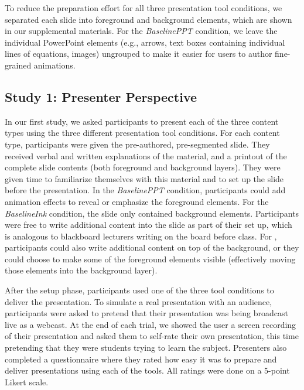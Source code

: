 To reduce the preparation effort for all three presentation tool conditions, we separated each slide into foreground and background elements, which are shown in our supplemental materials. For the \textit{BaselinePPT} condition, we leave the individual PowerPoint elements (e.g., arrows, text boxes containing individual lines of equations, images) ungrouped to make it easier for users to author fine-grained animations. 
%

\subsection{Study 1: Presenter Perspective}
In our first study, we asked participants to present each of the three content types using the three different presentation tool conditions. 
%
For each content type, participants were given the pre-authored, pre-segmented slide. 
They received verbal and written explanations of the material, and a printout of the complete slide contents (both foreground and background layers). They were given time to familiarize themselves with this material and to set up the slide before the presentation.
%
In the \textit{BaselinePPT} condition, participants could add animation effects to reveal or emphasize the foreground elements. For the \textit{BaselineInk} condition, the slide only contained background elements. Participants were free to write additional content into the slide as part of their set up, which is analogous to blackboard lecturers writing on the board before class. For \interface, participants could also write additional content on top of the background, or they could choose to make some of the foreground elements visible (effectively moving those elements into the background layer). 

After the setup phase, participants used one of the three tool conditions to deliver the presentation. 
%
To simulate a real presentation with an audience, participants were asked to pretend that their presentation was being broadcast live as a webcast. At the end of each trial, we showed the user a screen recording of their presentation and asked them to self-rate their own presentation, this time pretending that they were students trying to learn the subject. Presenters also completed a questionnaire where they rated how easy it was to prepare and deliver presentations using each of the tools. All ratings were done on a 5-point Likert scale.

